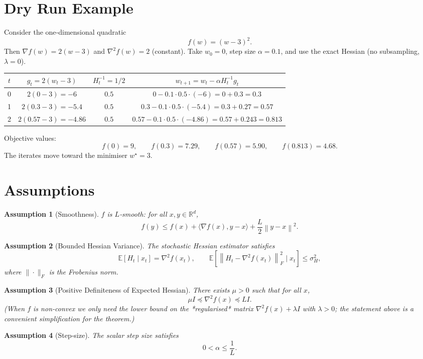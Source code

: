 \documentclass{article}
\newtheorem{assumption}{Assumption}
\newcommand{\E}{\mathbb{E}}
\newcommand{\R}{\mathbb{R}}
\newcommand{\norm}[1]{\left\|#1\right\|}
\newcommand{\grad}{\nabla}
\begin{document}
\section*{Dry Run Example}
Consider the one‑dimensional quadratic
\[
f(w)=(w-3)^2 .
\]
Then $\grad f(w)=2(w-3)$ and $\nabla^2 f(w)=2$ (constant).  
Take $w_0=0$, step size $\alpha=0.1$, and use the exact Hessian (no subsampling, $\lambda=0$).

\begin{center}
\begin{tabular}{c|c|c|c}
$t$ & $g_t=2(w_t-3)$ & $H_t^{-1}=1/2$ & $w_{t+1}=w_t-\alpha H_t^{-1}g_t$\\ \hline
0 & $2(0-3)=-6$ & $0.5$ & $0-0.1\cdot0.5\cdot(-6)=0+0.3=0.3$\\
1 & $2(0.3-3)=-5.4$ & $0.5$ & $0.3-0.1\cdot0.5\cdot(-5.4)=0.3+0.27=0.57$\\
2 & $2(0.57-3)=-4.86$ & $0.5$ & $0.57-0.1\cdot0.5\cdot(-4.86)=0.57+0.243=0.813$\\
\end{tabular}
\end{center}

Objective values:
\[
f(0)=9,\qquad f(0.3)=7.29,\qquad f(0.57)=5.90,\qquad f(0.813)=4.68 .
\]
The iterates move toward the minimiser $w^\star=3$.

\newpage
\section*{Assumptions}
\begin{assumption}[Smoothness]\label{as:smooth}
$f$ is $L$‑smooth: for all $x,y\in\R^d$,
\[
f(y)\le f(x)+\langle \grad f(x),y-x\rangle+\frac{L}{2}\norm{y-x}^2 .
\]
\end{assumption}
\begin{assumption}[Bounded Hessian Variance]\label{as:var}
The stochastic Hessian estimator satisfies
\[
\E[H_t\mid x_t]=\nabla^2 f(x_t),\qquad 
\E\!\left[\norm{H_t-\nabla^2 f(x_t)}_F^2\mid x_t\right]\le \sigma_H^2 ,
\]
where $\|\cdot\|_F$ is the Frobenius norm.
\end{assumption}
\begin{assumption}[Positive Definiteness of Expected Hessian]\label{as:posdef}
There exists $\mu>0$ such that for all $x$,
\[
\mu I \preceq \nabla^2 f(x) \preceq L I .
\]
(When $f$ is non‑convex we only need the lower bound on the *regularised* matrix
$\nabla^2 f(x)+\lambda I$ with $\lambda>0$; the statement above is a convenient
simplification for the theorem.)
\end{assumption}
\begin{assumption}[Step‑size]\label{as:stepsize}
The scalar step size satisfies
\[
0<\alpha\le \frac{1}{L}.
\]
\end{assumption}
\end{document}
